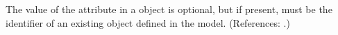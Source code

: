 The value of the attribute  in a \Reaction object is
optional, but if present, must be the identifier of an existing
\Compartment object defined in the model.  (References: .)
